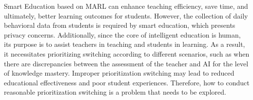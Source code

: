 \documentclass[acmsmall]{acmart}
\begin{document}
Smart Education based on MARL can enhance teaching efficiency, save time, and ultimately, better learning outcomes for students. However, the collection of daily behavioral data from students is required by smart education, which presents privacy concerns. Additionally, since the core of intelligent education is human, its purpose is to assist teachers in teaching and students in learning. As a result, it necessitates prioritizing switching according to different scenarios, such as when there are discrepancies between the assessment of the teacher and AI for the level of knowledge mastery. Improper prioritization switching may lead to reduced educational effectiveness and poor student experiences. Therefore, how to conduct reasonable prioritization switching is a problem that needs to be explored.
\end{document}
